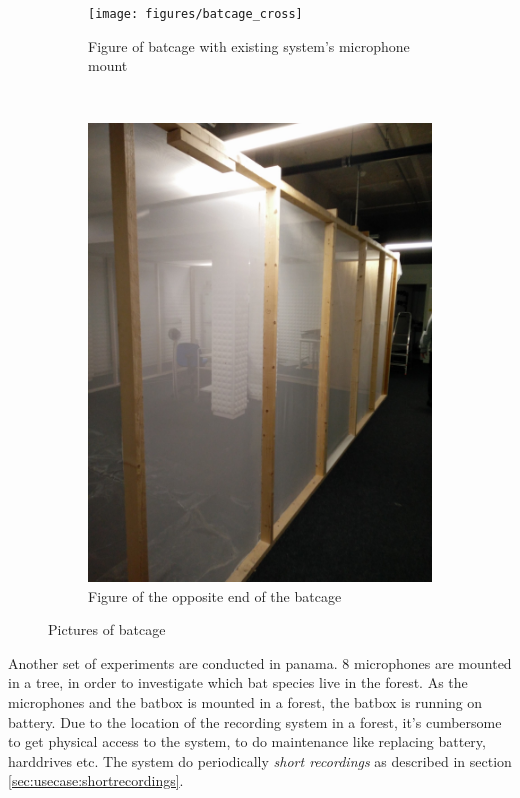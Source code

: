 \begin{figure}[!h]
    \centering
    \begin{subfigure}[b]{0.45\textwidth}
        \texttt{[image: figures/batcage\_cross]}
        \caption{Figure of batcage with existing system's microphone mount}
        \label{fig:gull}
    \end{subfigure}
    ~ %
    \begin{subfigure}[b]{0.45\textwidth}
        \includegraphics[width=\textwidth]{figures/batcage}
        \caption{Figure of the opposite end of the batcage}
        \label{fig:mouse}
    \end{subfigure}
    \caption{Pictures of batcage}\label{fig:usecase:batcage}
\end{figure}

Another set of experiments are conducted in panama. 8 microphones are mounted in a tree, in order to investigate which bat species live in the forest. As the microphones and the batbox is mounted in a forest, the batbox is running on battery. Due to the location of the recording system in a forest, it's cumbersome to get physical access to the system, to do maintenance like replacing battery, harddrives etc. The system do periodically \textit{short recordings} as described in section \ref{sec:usecase:shortrecordings}. 

